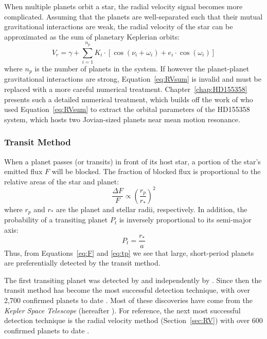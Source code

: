When multiple planets orbit a star, the radial velocity signal becomes more complicated.
Assuming that the planets are well-separated such that their mutual gravitational interactions are weak, the radial velocity of the star can be approximated as the sum of planetary Keplerian orbits:
\begin{equation}
V_r = \gamma + \sum_{i=1}^{n_p} K_i \cdot [\cos(\nu_i + \omega_i) + e_i\cdot \cos(\omega_i)]
\label{eq:RVsum}
\end{equation}
where $n_p$ is the number of planets in the system. 
If however the planet-planet gravitational interactions are strong, Equation~\ref{eq:RVsum} is invalid and must be replaced with a more careful numerical treatment. 
Chapter~\ref{chap:HD155358} presents such a detailed numerical treatment, which builds off the work of  \citet{Robertson2012} who used Equation~\ref{eq:RVsum} to extract the orbital parameters of the HD155358 system, which hosts two Jovian-sized planets near mean motion resonance. 

\subsubsection{Transit Method}
\label{sec:transit}
When a planet passes (or transits) in front of its host star, a portion of the star's emitted flux $F$ will be blocked. 
The fraction of blocked flux is proportional to the relative areas of the star and planet:
\begin{equation}
\frac{\Delta F}{F} \propto \left(\frac{r_p}{r_*}\right)^2
\label{eq:F}
\end{equation}
where $r_p$ and $r_*$ are the planet and stellar radii, respectively. 
In addition, the probability of a transiting planet $P_t$ is inversely proportional to its semi-major axis:
\begin{equation}
P_t = \frac{r_*}{a}
\label{eq:tp}
\end{equation}
Thus, from Equations~\ref{eq:F} and \ref{eq:tp} we see that large, short-period planets are preferentially detected by the transit method.

The first transiting planet was detected by \citet{Henry1999} and independently by \citet{Charbonneau2000}.
Since then the transit method has become the most successful detection technique, with over 2,700 confirmed planets to date \citep{Akeson2013}. 
Most of these discoveries have come from the \textit{Kepler Space Telescope} (hereafter \kep).
For reference, the next most successful detection technique is the radial velocity method (Section~\ref{sec:RV}) with over 600 confirmed planets to date \citep{Akeson2013}.

